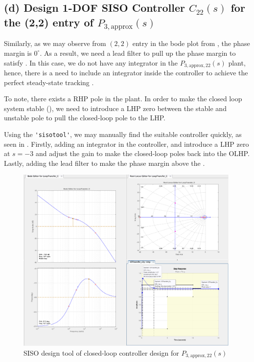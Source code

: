 \documentclass{tron}
\newcommand{\apx}{\text{approx}}
\begin{document}
\clearpage
\subsection{(d) Design 1-DOF SISO Controller $C_{22}(s)$ for the (2,2) entry of $P_{3, \apx}(s)$ \label{ans:P5-d}}
Similarly, as we may observe from $(2,2)$ entry in the bode plot from , the phase margin is $0^{\circ}$. As a result, we need a lead filter to pull up the phase margin to satisfy . In this case, we do not have any integrator in the $P_{3, \apx, 22}(s)$ plant, hence, there is a need to include an integrator inside the controller to achieve the perfect steady-state tracking . 

To note, there exists a RHP pole in the plant. In order to make the closed loop system stable (), we need to introduce a LHP zero between the stable and unstable pole to pull the closed-loop pole to the LHP.

Using the \verb|'sisotool'|, we may manually find the suitable controller quickly, as seen in . Firstly, adding an integrator in the controller, and introduce a LHP zero at $s=-3$ and adjust the gain to make the closed-loop poles back into the OLHP. Lastly, adding the lead filter to make the phase margin above the .

\begin{figure}[H]
	\centering
	\includegraphics[height=350px]{../matlab/misc/sisotool_P3_aug_22.png}
	\caption{SISO design tool of closed-loop controller design for $P_{3, \apx, 22}(s)$}
	\label{fig:p5:P3_aug22:siso}
\end{figure}
\end{document}
